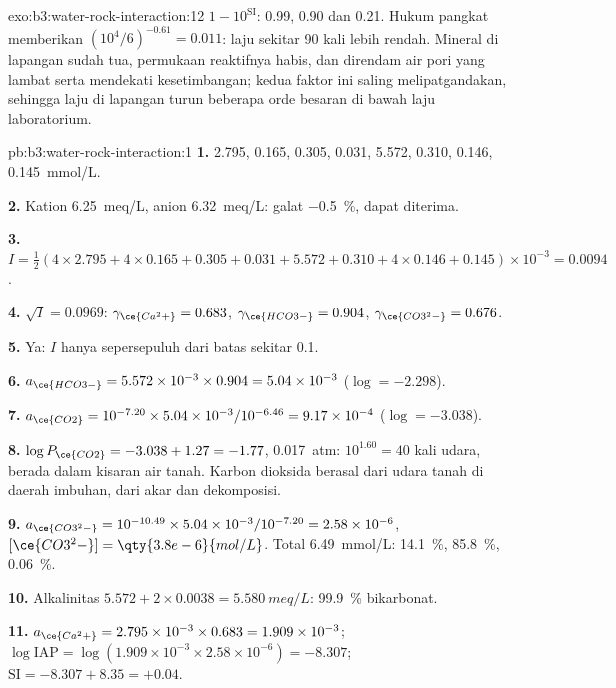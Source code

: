 \begin{solution}{exo:b3:water-rock-interaction:12}
$1 - 10^{\mathrm{SI}}$: 0.99, 0.90 dan 0.21. Hukum pangkat memberikan
$(10^4/6)^{-0.61} = 0.011$: laju sekitar 90 kali lebih rendah. Mineral di lapangan
sudah tua, permukaan reaktifnya habis, dan direndam air pori yang lambat
serta mendekati kesetimbangan; kedua faktor ini saling melipatgandakan, sehingga laju di lapangan turun beberapa orde besaran
di bawah laju laboratorium.
\end{solution}

\begin{solution}{pb:b3:water-rock-interaction:1}
\textbf{1.}  2.795,  0.165,  0.305,  0.031,
 5.572,  0.310,  0.146,  \qty{0.145}{mmol/L}.

\textbf{2.} Kation \qty{6.25}{meq/L}, anion \qty{6.32}{meq/L}: galat
\qty{-0.5}{\percent}, dapat diterima.

\textbf{3.} $I = \tfrac12(4\times2.795 + 4\times0.165 + 0.305 + 0.031 + 5.572
+ 0.310 + 4\times0.146 + 0.145)\times10^{-3} = 0.0094$.

\textbf{4.} $\sqrt I = 0.0969$: $\gamma_{\ce{Ca^2+}} = 0.683$,
$\gamma_{\ce{HCO3-}} = 0.904$, $\gamma_{\ce{CO3^2-}} = 0.676$.

\textbf{5.} Ya: $I$ hanya sepersepuluh dari batas sekitar 0.1.

\textbf{6.} $a_{\ce{HCO3-}} = 5.572\times10^{-3}\times0.904 = 5.04\times
10^{-3}$ ($\log = -2.298$).

\textbf{7.} $a_{\ce{CO2}} = 10^{-7.20}\times5.04\times10^{-3}/10^{-6.46} =
9.17\times10^{-4}$ ($\log = -3.038$).

\textbf{8.} $\log P_{\ce{CO2}} = -3.038 + 1.27 = -1.77$, \qty{0.017}{atm}:
$10^{1.60} = 40$ kali udara, berada dalam kisaran air tanah. Karbon
dioksida berasal dari udara tanah di daerah imbuhan, dari akar dan dekomposisi.

\textbf{9.} $a_{\ce{CO3^2-}} = 10^{-10.49}\times5.04\times10^{-3}/10^{-7.20}
= 2.58\times10^{-6}$, $[\ce{CO3^2-}] = \qty{3.8e-6}{mol/L}$. Total
\qty{6.49}{mmol/L}:  \qty{14.1}{\percent}, 
\qty{85.8}{\percent},  \qty{0.06}{\percent}.

\textbf{10.} Alkalinitas $5.572 + 2\times0.0038 = \qty{5.580}{meq/L}$:
\qty{99.9}{\percent} bikarbonat.

\textbf{11.} $a_{\ce{Ca^2+}} = 2.795\times10^{-3}\times0.683 = 1.909\times
10^{-3}$; $\log\mathrm{IAP} = \log(1.909\times10^{-3}\times2.58\times10^{-6})
= -8.307$; $\mathrm{SI} = -8.307 + 8.35 = +0.04$.


\end{solution}
